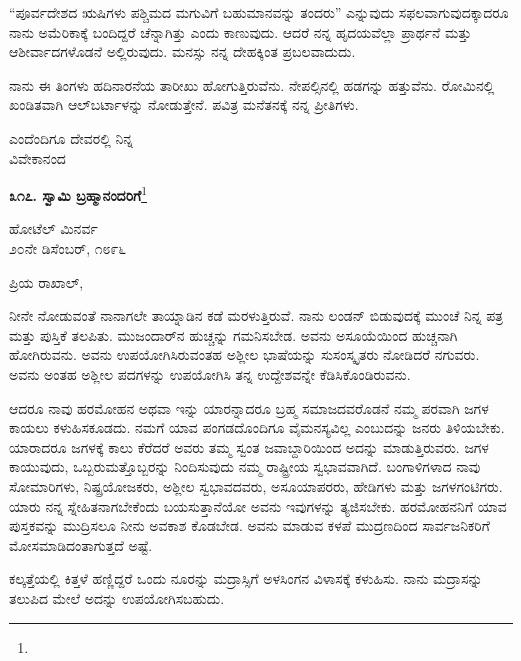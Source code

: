 “ಪೂರ್ವದೇಶದ ಋಷಿಗಳು ಪಶ್ಚಿಮದ ಮಗುವಿಗೆ ಬಹುಮಾನವನ್ನು ತಂದರು” ಎನ್ನುವುದು ಸಫಲವಾಗುವುದಕ್ಕಾದರೂ ನಾನು ಅಮೆರಿಕಾಕ್ಕೆ ಬಂದಿದ್ದರೆ ಚೆನ್ನಾಗಿತ್ತು ಎಂದು ಕಾಣುವುದು. ಆದರೆ ನನ್ನ ಹೃದಯವೆಲ್ಲಾ ಪ್ರಾರ್ಥನೆ ಮತ್ತು ಆಶೀರ್ವಾದಗಳೊಡನೆ ಅಲ್ಲಿರುವುದು. ಮನಸ್ಸು ನನ್ನ ದೇಹಕ್ಕಿಂತ ಪ್ರಬಲವಾದುದು.

ನಾನು ಈ ತಿಂಗಳು ಹದಿನಾರನೆಯ ತಾರೀಖು ಹೋಗುತ್ತಿರುವೆನು. ನೇಪಲ್ಸಿನಲ್ಲಿ ಹಡಗನ್ನು ಹತ್ತುವೆನು. ರೋಮಿನಲ್ಲಿ ಖಂಡಿತವಾಗಿ ಆಲ್‌ಬರ್ಟಾಳನ್ನು ನೋಡುತ್ತೇನೆ. ಪವಿತ್ರ ಮನೆತನಕ್ಕೆ ನನ್ನ ಪ್ರೀತಿಗಳು.

\vspace{-0.5cm}

{\flushright
ಎಂದೆಂದಿಗೂ ದೇವರಲ್ಲಿ ನಿನ್ನ\\ವಿವೇಕಾನಂದ\par}

\begin{center}
\textbf{೩೧೭. ಸ್ವಾಮಿ ಬ್ರಹ್ಮಾನಂದರಿಗೆ}\footnote{}
\end{center}

\vspace{-0.65cm}

\begin{flushright}
ಹೋಟೆಲ್ ಮಿನರ್ವ\\೨೦ನೇ ಡಿಸೆಂಬರ್, ೧೮೯೬
\end{flushright}

\vspace{-0.3cm}

\noindent
ಪ್ರಿಯ ರಾಖಾಲ್,

ನೀನೇ ನೋಡುವಂತೆ ನಾನಾಗಲೇ ತಾಯ್ನಾಡಿನ ಕಡೆ ಮರಳುತ್ತಿರುವೆ. ನಾನು ಲಂಡನ್ ಬಿಡುವುದಕ್ಕೆ ಮುಂಚೆ ನಿನ್ನ ಪತ್ರ ಮತ್ತು ಪುಸ್ತಿಕೆ ತಲಪಿತು. ಮುಜಂದಾರ್‌ನ ಹುಚ್ಚನ್ನು ಗಮನಿಸಬೇಡ. ಅವನು ಅಸೂಯೆಯಿಂದ ಹುಚ್ಚನಾಗಿ ಹೋಗಿರುವನು. ಅವನು ಉಪಯೋಗಿಸಿರುವಂತಹ ಅಶ್ಲೀಲ ಭಾಷೆಯನ್ನು ಸುಸಂಸ್ಕೃತರು ನೋಡಿದರೆ ನಗುವರು. ಅವನು ಅಂತಹ ಅಶ್ಲೀಲ ಪದಗಳನ್ನು ಉಪಯೋಗಿಸಿ ತನ್ನ ಉದ್ದೇಶವನ್ನೇ ಕೆಡಿಸಿಕೊಂಡಿರುವನು.

ಆದರೂ ನಾವು ಹರಮೋಹನ ಅಥವಾ ಇನ್ನು ಯಾರನ್ನಾದರೂ ಬ್ರಹ್ಮ ಸಮಾಜದವರೊಡನೆ ನಮ್ಮ ಪರವಾಗಿ ಜಗಳ ಕಾಯಲು ಕಳುಹಿಸಕೂಡದು. ನಮಗೆ ಯಾವ ಪಂಗಡದೊಂದಿಗೂ ವೈಮನಸ್ಯವಿಲ್ಲ ಎಂಬುದನ್ನು ಜನರು ತಿಳಿಯಬೇಕು. ಯಾರಾದರೂ ಜಗಳಕ್ಕೆ ಕಾಲು ಕೆರೆದರೆ ಅವರು ತಮ್ಮ ಸ್ವಂತ ಜವಾಬ್ದಾರಿಯಿಂದ ಅದನ್ನು ಮಾಡುತ್ತಿರುವರು. ಜಗಳ ಕಾಯುವುದು, ಒಬ್ಬರುಮತ್ತೊಬ್ಬರನ್ನು ನಿಂದಿಸುವುದು ನಮ್ಮ ರಾಷ್ಟ್ರೀಯ ಸ್ವಭಾವವಾಗಿದೆ. ಬಂಗಾಳಿಗಳಾದ ನಾವು ಸೋಮಾರಿಗಳು, ನಿಷ್ಪ್ರಯೋಜಕರು, ಅಶ್ಲೀಲ ಸ್ವಭಾವದವರು, ಅಸೂಯಾಪರರು, ಹೇಡಿಗಳು ಮತ್ತು ಜಗಳಗಂಟಿಗರು. ಯಾರು ನನ್ನ ಸ್ನೇಹಿತನಾಗಬೇಕೆಂದು ಬಯಸುತ್ತಾನೆಯೋ ಅವನು ಇವುಗಳನ್ನು ತ್ಯಜಿಸಬೇಕು. ಹರಮೋಹನನಿಗೆ ಯಾವ ಪುಸ್ತಕವನ್ನು ಮುದ್ರಿಸಲೂ ನೀನು ಅವಕಾಶ ಕೊಡಬೇಡ. ಅವನು ಮಾಡುವ ಕಳಪೆ ಮುದ್ರಣದಿಂದ ಸಾರ್ವಜನಿಕರಿಗೆ ಮೋಸಮಾಡಿದಂತಾಗುತ್ತದೆ ಅಷ್ಟೆ.

ಕಲ್ಕತ್ತೆಯಲ್ಲಿ ಕಿತ್ತಳೆ ಹಣ್ಣಿದ್ದರೆ ಒಂದು ನೂರನ್ನು ಮದ್ರಾಸ್ಸಿಗೆ ಅಳಸಿಂಗನ ವಿಳಾಸಕ್ಕೆ ಕಳುಹಿಸು. ನಾನು ಮದ್ರಾಸನ್ನು ತಲುಪಿದ ಮೇಲೆ ಅದನ್ನು ಉಪಯೋಗಿಸಬಹುದು.

